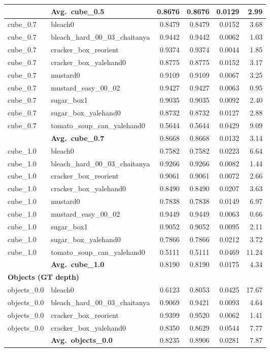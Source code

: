 \begin{longtable}{llrrrr}
  & \textbf{Avg.~cube_0.5} & 0.8676 & 0.8676 & 0.0129 & 2.99 \\
  \midrule
  cube_0.7 & bleach0 & 0.8479 & 0.8479 & 0.0152 & 3.68 \\
  cube_0.7 & bleach\_hard\_00\_03\_chaitanya & 0.9442 & 0.9442 & 0.0062 & 1.03 \\
  cube_0.7 & cracker\_box\_reorient & 0.9374 & 0.9374 & 0.0044 & 1.85 \\
  cube_0.7 & cracker\_box\_yalehand0 & 0.8775 & 0.8775 & 0.0152 & 3.17 \\
  cube_0.7 & mustard0 & 0.9109 & 0.9109 & 0.0067 & 3.25 \\
  cube_0.7 & mustard\_easy\_00\_02 & 0.9427 & 0.9427 & 0.0063 & 0.95 \\
  cube_0.7 & sugar\_box1 & 0.9035 & 0.9035 & 0.0092 & 2.40 \\
  cube_0.7 & sugar\_box\_yalehand0 & 0.8732 & 0.8732 & 0.0127 & 2.88 \\
  cube_0.7 & tomato\_soup\_can\_yalehand0 & 0.5644 & 0.5644 & 0.0429 & 9.09 \\
  \cmidrule{2-6}
  & \textbf{Avg.~cube_0.7} & 0.8668 & 0.8668 & 0.0132 & 3.14 \\
  \midrule
  cube_1.0 & bleach0 & 0.7582 & 0.7582 & 0.0223 & 6.64 \\
  cube_1.0 & bleach\_hard\_00\_03\_chaitanya & 0.9266 & 0.9266 & 0.0082 & 1.44 \\
  cube_1.0 & cracker\_box\_reorient & 0.9061 & 0.9061 & 0.0072 & 2.66 \\
  cube_1.0 & cracker\_box\_yalehand0 & 0.8490 & 0.8490 & 0.0207 & 3.63 \\
  cube_1.0 & mustard0 & 0.7838 & 0.7838 & 0.0149 & 6.97 \\
  cube_1.0 & mustard\_easy\_00\_02 & 0.9449 & 0.9449 & 0.0063 & 0.66 \\
  cube_1.0 & sugar\_box1 & 0.9052 & 0.9052 & 0.0095 & 2.11 \\
  cube_1.0 & sugar\_box\_yalehand0 & 0.7866 & 0.7866 & 0.0212 & 3.72 \\
  cube_1.0 & tomato\_soup\_can\_yalehand0 & 0.5111 & 0.5111 & 0.0469 & 11.24 \\
  \cmidrule{2-6}
  & \textbf{Avg.~cube_1.0} & 0.8190 & 0.8190 & 0.0175 & 4.34 \\
  \midrule
\multicolumn{6}{l}{\textbf{Objects (GT depth)}} \\
\midrule
  objects_0.0 & bleach0 & 0.6123 & 0.8053 & 0.0425 & 17.67 \\
  objects_0.0 & bleach\_hard\_00\_03\_chaitanya & 0.9069 & 0.9421 & 0.0093 & 4.64 \\
  objects_0.0 & cracker\_box\_reorient & 0.9399 & 0.9520 & 0.0062 & 1.41 \\
  objects_0.0 & cracker\_box\_yalehand0 & 0.8350 & 0.8629 & 0.0544 & 7.77 \\
  \cmidrule{2-6}
  & \textbf{Avg.~objects_0.0} & 0.8235 & 0.8906 & 0.0281 & 7.87 \\
  \midrule
\bottomrule
\end{longtable}